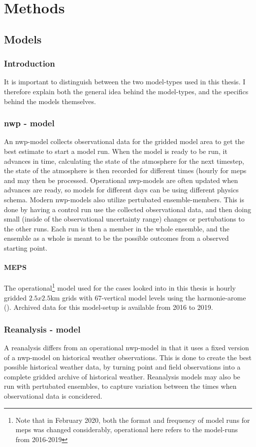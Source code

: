 \setcounter{chapter}{2}
\chapter{Methods}

\section{Models}

\subsection{Introduction}
It is important to distinguish between the two model-types used in this thesis. I therefore explain both the general idea behind the model-types, and the specifics behind the models themselves. 
\subsection{\acrfull{nwp} - model}
An \acrshort{nwp}-model collects observational data for the gridded model area to get the best estimate to start a model run. When the model is ready to be run, it advances in time, calculating the state of the atmosphere for the next timestep, the state of the atmosphere is then recorded for different times (hourly for \acrshort{meps} and may then be processed. Operational \acrshort{nwp}-models are often updated when advances are ready, so models for different days can be using different physics schema. Modern \acrshort{nwp}-models also utilize pertubated ensemble-members. This is done by having a control run use the collected observational data, and then doing small (inside of the observational uncertainty range) changes or pertubations to the other runs. Each run is then a member in the whole ensemble, and the ensemble as a whole is meant to be the possible outcomes from a observed starting point.
\subsubsection{MEPS}
The operational\footnote{Note that in February 2020, both the format and frequency of model runs for \acrfull{meps} was changed considerably, operational here refers to the model-runs from 2016-2019} model used for the cases looked into in this thesis is hourly gridded $2.5x2.5$km grids with $67$-vertical model levels using the harmonie-arome (\cite{aromehirlam}). Archived data for this model-setup is available from 2016 to 2019.
\subsection{Reanalysis - model}
A reanalysis differs from an operational \acrshort{nwp}-model in that it uses a fixed version of a \acrshort{nwp}-model on historical weather observations. This is done to create the best possible historical weather data, by turning point and field observations into a complete gridded archive of historical weather. Reanalysis models may also be run with pertubated ensembles, to capture variation between the times when observational data is concidered.
